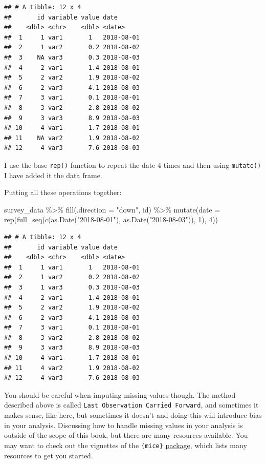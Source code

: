 \documentclass[
]{article}
\newenvironment{Shaded}{\begin{snugshade}}{\end{snugshade}}
\newcommand{\AttributeTok}[1]{\textcolor[rgb]{0.77,0.63,0.00}{#1}}
\newcommand{\DecValTok}[1]{\textcolor[rgb]{0.00,0.00,0.81}{#1}}
\newcommand{\FunctionTok}[1]{\textcolor[rgb]{0.00,0.00,0.00}{#1}}
\newcommand{\NormalTok}[1]{#1}
\newcommand{\SpecialCharTok}[1]{\textcolor[rgb]{0.00,0.00,0.00}{#1}}
\newcommand{\StringTok}[1]{\textcolor[rgb]{0.31,0.60,0.02}{#1}}
\begin{document}
\begin{verbatim}
## # A tibble: 12 x 4
##       id variable value date      
##    <dbl> <chr>    <dbl> <date>    
##  1     1 var1       1   2018-08-01
##  2     1 var2       0.2 2018-08-02
##  3    NA var3       0.3 2018-08-03
##  4     2 var1       1.4 2018-08-01
##  5     2 var2       1.9 2018-08-02
##  6     2 var3       4.1 2018-08-03
##  7     3 var1       0.1 2018-08-01
##  8     3 var2       2.8 2018-08-02
##  9     3 var3       8.9 2018-08-03
## 10     4 var1       1.7 2018-08-01
## 11    NA var2       1.9 2018-08-02
## 12     4 var3       7.6 2018-08-03
\end{verbatim}

I use the base \texttt{rep()} function to repeat the date 4 times and then using \texttt{mutate()} I have added
it the data frame.

Putting all these operations together:

\begin{Shaded}
\begin{Highlighting}[]
\NormalTok{survey\_data }\SpecialCharTok{\%\textgreater{}\%}
    \FunctionTok{fill}\NormalTok{(}\AttributeTok{.direction =} \StringTok{"down"}\NormalTok{, id) }\SpecialCharTok{\%\textgreater{}\%}
    \FunctionTok{mutate}\NormalTok{(}\AttributeTok{date =} \FunctionTok{rep}\NormalTok{(}\FunctionTok{full\_seq}\NormalTok{(}\FunctionTok{c}\NormalTok{(}\FunctionTok{as.Date}\NormalTok{(}\StringTok{"2018{-}08{-}01"}\NormalTok{), }\FunctionTok{as.Date}\NormalTok{(}\StringTok{"2018{-}08{-}03"}\NormalTok{)), }\DecValTok{1}\NormalTok{), }\DecValTok{4}\NormalTok{))}
\end{Highlighting}
\end{Shaded}

\begin{verbatim}
## # A tibble: 12 x 4
##       id variable value date      
##    <dbl> <chr>    <dbl> <date>    
##  1     1 var1       1   2018-08-01
##  2     1 var2       0.2 2018-08-02
##  3     1 var3       0.3 2018-08-03
##  4     2 var1       1.4 2018-08-01
##  5     2 var2       1.9 2018-08-02
##  6     2 var3       4.1 2018-08-03
##  7     3 var1       0.1 2018-08-01
##  8     3 var2       2.8 2018-08-02
##  9     3 var3       8.9 2018-08-03
## 10     4 var1       1.7 2018-08-01
## 11     4 var2       1.9 2018-08-02
## 12     4 var3       7.6 2018-08-03
\end{verbatim}

You should be careful when imputing missing values though. The method described above is called
\texttt{Last\ Observation\ Carried\ Forward}, and sometimes it makes sense, like here, but sometimes it doesn't and
doing this will introduce bias in your analysis. Discussing how to handle missing values in your analysis
is outside of the scope of this book, but there are many resources available. You may want to check
out the vignettes of the \texttt{\{mice\}} \href{https://amices.org/mice/articles/overview.html}{package}, which
lists many resources to get you started.
\end{document}
